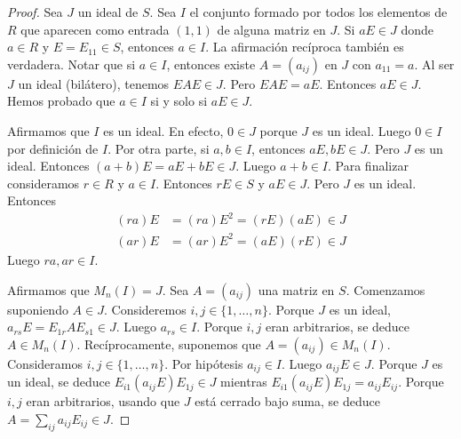\documentclass{report}
\begin{document}
  \begin{proof}
    Sea \(J\) un ideal de \(S\).
    Sea \(I\) el conjunto formado por todos los elementos de \(R\) que aparecen como entrada \((1, 1)\) de alguna matriz en \(J\).
    Si \(a E \in J\) donde \(a \in R\) y \(E = E_{1 1} \in S\), entonces \(a \in I\).
    La afirmación recíproca también es verdadera.
    Notar que si \(a \in I\), entonces existe \(A = (a_{i j})\) en \(J\) con \(a_{1 1} = a\).
    Al ser \(J\) un ideal (bilátero), tenemos \(E A E \in J\).
    Pero \(E A E = a E\).
    Entonces \(a E \in J\).
    Hemos probado que \(a \in I\) si y solo si \(a E \in J\).

    Afirmamos que \(I\) es un ideal.
    En efecto, \(0 \in J\) porque \(J\) es un ideal.
    Luego \(0 \in I\) por definición de \(I\).
    Por otra parte, si \(a, b \in I\), entonces \(a E, b E \in J\).
    Pero \(J\) es un ideal.
    Entonces \((a + b) E = a E + b E \in J\).
    Luego \(a + b \in I\).
    Para finalizar consideramos \(r \in R\) y \(a \in I\).
    Entonces \(r E \in S\) y \(a E \in J\).
    Pero \(J\) es un ideal.
    Entonces
    \begin{align}
      (r a) E
      &=
      (r a) E^2
      =
      (r E) (a E)
      \in J
      \\
      (a r) E
      &=
      (a r) E^2
      =
      (a E) (r E)
      \in J
    \end{align}
    Luego \(ra, ar \in I\).

    Afirmamos que \(M_n(I) = J\).
    Sea \(A = (a_{i j})\) una matriz en \(S\).
    Comenzamos suponiendo \(A \in J\).
    Consideremos \(i, j \in \{1, \dots, n\}\).
    Porque \(J\) es un ideal, \(a_{r s} E = E_{1 r} A E_{s 1} \in J\).
    Luego \(a_{r s} \in I\).
    Porque \(i, j\) eran arbitrarios, se deduce \(A \in M_n(I)\).
    Recíprocamente, suponemos que \(A = (a_{i j}) \in M_n(I)\).
    Consideramos \(i, j \in \{1, \dots, n\}\).
    Por hipótesis \(a_{i j} \in I\).
    Luego \(a_{i j} E \in J\).
    Porque \(J\) es un ideal, se deduce \(E_{i 1} (a_{i j} E) E_{1 j} \in J\) mientras \(E_{i 1} (a_{i j} E) E_{1 j} = a_{i j} E_{i j}\).
    Porque \(i, j\) eran arbitrarios, usando que \(J\) está cerrado bajo suma, se deduce \(A = \sum_{i j} a_{i j} E_{i j} \in J\).
  \end{proof}
\end{document}
